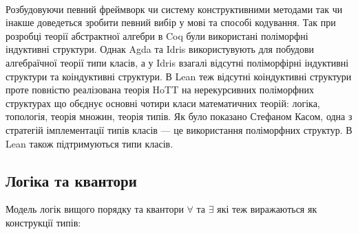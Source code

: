     \paragraph{}
    Розбудовуючи певний фреймворк чи систему конструктивними методами
    так чи інакше доведеться зробити певний вибір у мові та способі кодування.
    Так при розробці теорії абстрактної алгебри в Coq були використані
    поліморфні індуктивні структури. Однак Agda та Idris використувують
    для побудови алгебраїчної теорії типи класів, а у Idris взагалі відсутні
    поліморфірні індуктивні структури та коіндуктивні структури. В Lean
    теж відсутні коіндуктивні структури проте повністю реалізована теорія
    HoTT на нерекурсивних поліморфних структурах що обєднує основні чотири
    класи математичних теорій: логіка, топологія, теорія множин, теорія типів.
    Як було показано Стефаном Касом, одна з
    стратегій імплементації типів класів --- це використання поліморфних структур.
    В Lean також підтримуються типи класів.

\newpage
    \subsection{Логіка та квантори}

    Модель логік вищого порядку та квантори $\forall$ та $\exists$ які
    теж виражаються як конструкції типів:

\begingroup
\parbox[t][][l]{0.40\textwidth}{

\begin{prooftree}
\end{prooftree}

\begin{prooftree}
\end{prooftree}

}
\hspace{0.1cm}
\parbox[t][][r]{0.60\textwidth}{

\begin{prooftree}
\end{prooftree}


\begin{prooftree}
\end{prooftree}

}
\endgroup

